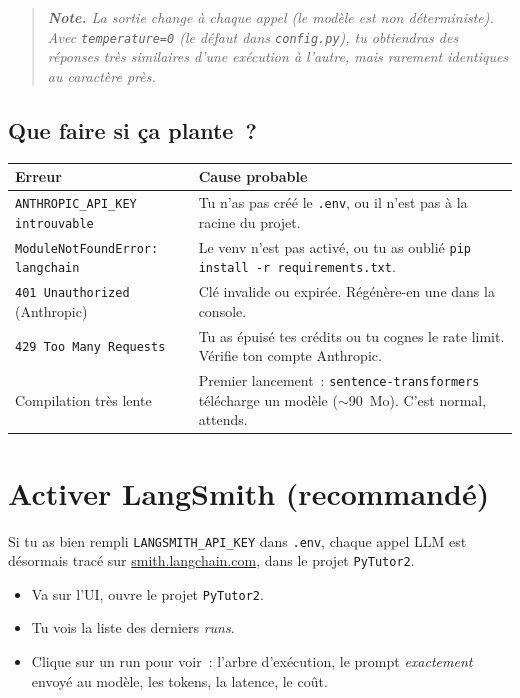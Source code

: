 \documentclass[11pt,a4paper]{article}
\begin{document}
\begin{quote}\itshape
\textbf{Note.} La sortie change à chaque appel (le modèle est non
déterministe). Avec \texttt{temperature=0} (le défaut dans
\texttt{config.py}), tu obtiendras des réponses très similaires
d'une exécution à l'autre, mais rarement identiques au caractère
près.
\end{quote}

\subsection{Que faire si ça plante~?}

\begin{center}
\begin{tabular}{p{5cm} p{10.5cm}}
\toprule
\textbf{Erreur} & \textbf{Cause probable} \\
\midrule
\texttt{ANTHROPIC\_API\_KEY introuvable} &
   Tu n'as pas créé le \texttt{.env}, ou il n'est pas à la racine du
   projet. \\[1mm]
\texttt{ModuleNotFoundError: langchain} &
   Le venv n'est pas activé, ou tu as oublié
   \texttt{pip install -r requirements.txt}. \\[1mm]
\texttt{401 Unauthorized} (Anthropic) &
   Clé invalide ou expirée. Régénère-en une dans la console. \\[1mm]
\texttt{429 Too Many Requests} &
   Tu as épuisé tes crédits ou tu cognes le rate limit. Vérifie ton
   compte Anthropic. \\[1mm]
Compilation très lente &
   Premier lancement~: \texttt{sentence-transformers} télécharge
   un modèle (\(\sim\)90~Mo). C'est normal, attends. \\
\bottomrule
\end{tabular}
\end{center}

\section{Activer LangSmith (recommandé)}

Si tu as bien rempli \texttt{LANGSMITH\_API\_KEY} dans \texttt{.env},
chaque appel LLM est désormais tracé sur
\href{https://smith.langchain.com}{smith.langchain.com}, dans le
projet \texttt{PyTutor2}.

\begin{itemize}[leftmargin=*]
  \item Va sur l'UI, ouvre le projet \texttt{PyTutor2}.
  \item Tu vois la liste des derniers \emph{runs}.
  \item Clique sur un run pour voir~: l'arbre d'exécution, le prompt
        \emph{exactement} envoyé au modèle, les tokens, la latence,
        le coût.
\end{itemize}
\end{document}
